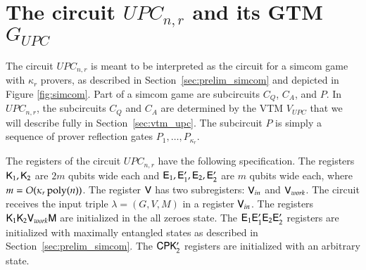 \section{The circuit $UPC_{n,r}$ and its GTM $G_{UPC}$}
\label{sec:upc}

The circuit $UPC_{n,r}$ is meant to be interpreted as the circuit for a simcom game with $\kappa_r$ provers, as described in Section~\ref{sec:prelim_simcom} and depicted in Figure \ref{fig:simcom}. Part of a simcom game are subcircuits $C_Q$, $C_A$, and $P$. In $UPC_{n,r}$, the subcircuits $C_Q$ and $C_A$ are determined by the VTM $V_{UPC}$ that we will describe fully in Section~\ref{sec:vtm_upc}. The subcircuit $P$ is simply a sequence of prover reflection gates $P_1,\ldots,P_{\kappa_r}$. %

The registers of the circuit $UPC_{n,r}$ have the following specification. The registers ${\mathsf{K}}_1, {\mathsf{K}}_2$ are $2m$ qubits wide each and ${\mathsf{E}}_1,{\mathsf{E}}_1',{\mathsf{E}}_2,{\mathsf{E}}_2'$ are $m$ qubits wide each, where $m = O(\kappa_r \operatorname{poly}(n))$. The register ${\mathsf{V}}$ has two subregisters: ${\mathsf{V}}_{in}$ and ${\mathsf{V}}_{work}$. The circuit receives the input triple $\lambda = (G,V,M)$ in a register ${\mathsf{V}}_{in}$. The registers ${\mathsf{K}}_1 {\mathsf{K}}_2 {\mathsf{V}}_{work} {\mathsf{M}}$ are initialized in the all zeroes state. The ${\mathsf{E}}_1 {\mathsf{E}}_1' {\mathsf{E}}_2 {\mathsf{E}}_2'$ registers are initialized with maximally entangled states as described in Section~\ref{sec:prelim_simcom}. The ${\mathsf{C}} {\mathsf{P}} {\mathsf{K}}_2'$ registers are initialized with an arbitrary state.




